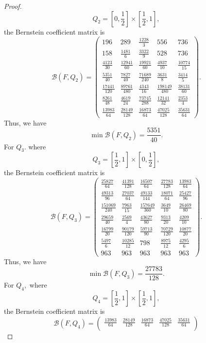 \documentclass[a4paper,12pt,reqno]{amsart} %
\numberwithin{equation}{section}
\theoremstyle{definition}
\begin{document}
\begin{proof}
\[
Q_2=\left[0,\frac12\right]\times\left[\frac12,1\right],
\]
the Bernstein coefficient matrix is
\[
\mathcal B(F,Q_2)=
\begin{pmatrix}
	196 & 289 & \frac{1228}{3} & 556 & 736\\[5mm]
	158 & \frac{1481}{6} & \frac{3322}{9} & 528 & 736\\[5mm]
	\frac{4123}{30} & \frac{12941}{60} & \frac{19921}{60} & \frac{4937}{10} & \frac{10774}{15}\\[5mm]
	\frac{5351}{40} & \frac{7827}{40} & \frac{71689}{240} & \frac{3631}{8} & \frac{3414}{5}\\[5mm]
	\frac{17441}{120} & \frac{89761}{480} & \frac{4343}{16} & \frac{198149}{480} & \frac{38131}{60}\\[5mm]
	\frac{8261}{48} & \frac{4619}{24} & \frac{73745}{288} & \frac{12141}{32} & \frac{2353}{4}\\[5mm]
	\frac{13983}{64} & \frac{28149}{128} & \frac{16873}{64} & \frac{47025}{128} & \frac{35631}{64}
\end{pmatrix}.
\]
Thus, we have
\[
\min \mathcal B(F,Q_2)=\frac{5351}{40}.
\]
For $Q_{3}.$ where
\[
Q_3=\left[\frac12,1\right]\times\left[0,\frac12\right],
\]
the Bernstein coefficient matrix is
\[
\mathcal B(F,Q_3)=
\begin{pmatrix}
	\frac{25827}{64} & \frac{41391}{128} & \frac{16507}{64} & \frac{27783}{128} & \frac{13983}{64}\\[5mm]
	\frac{49313}{96} & \frac{27037}{64} & \frac{49133}{144} & \frac{18071}{64} & \frac{25427}{96}\\[5mm]
	\frac{151069}{240} & \frac{7963}{15} & \frac{157649}{360} & \frac{3649}{10} & \frac{26469}{80}\\[5mm]
	\frac{29659}{40} & \frac{2569}{4} & \frac{43627}{80} & \frac{9313}{20} & \frac{4209}{10}\\[5mm]
	\frac{16799}{20} & \frac{90179}{120} & \frac{59713}{90} & \frac{70729}{120} & \frac{10877}{20}\\[5mm]
	\frac{5497}{6} & \frac{10285}{12} & 798 & \frac{8975}{12} & \frac{4295}{6}\\[5mm]
	963 & 963 & 963 & 963 & 963
\end{pmatrix}.
\]
Thus, we have
\[
\min \mathcal B(F,Q_3)=\frac{27783}{128}.
\]
For $Q_{4},$ where
\[
Q_4=\left[\frac12,1\right]\times\left[\frac12,1\right],
\]
the Bernstein coefficient matrix is
\[
\mathcal B(F,Q_4)=
\begin{pmatrix}
	\frac{13983}{64} & \frac{28149}{128} & \frac{16873}{64} & \frac{47025}{128} & \frac{35631}{64}\\[5mm]

\end{pmatrix}\]
\end{proof}
\end{document}
